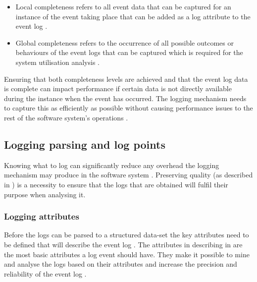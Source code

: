 \begin{itemize}
	\item Local completeness refers to all event data that can be captured for an instance of the event taking place that can be added as a log attribute to the event log \cite{Kherbouche2017, VanDerAalst2004}.
	\item Global completeness refers to the occurrence of all possible outcomes or behaviours of the event logs that can be captured which is required for the system utilisation analysis \cite{Kherbouche2017, VanDerAalst2004}.
\end{itemize}

Ensuring that both completeness levels are achieved and that the event log data is complete can impact performance if certain data is not directly available during the instance when the event has occurred. The logging mechanism needs to capture this as efficiently as possible without causing performance issues to the rest of the software system's operations \cite{Zhu2015, Zhu2019}. 

\subsection{Logging parsing and log points}\label{sec:ch1_loggignPoints}
Knowing what to log can significantly reduce any overhead the logging mechanism may produce in the software system \cite{Jia2018, Pecchia2015}. Preserving quality (as described in ) is a necessity to ensure that the logs that are obtained will fulfil their purpose when analysing it.

\subsubsection{Logging attributes}
Before the logs can be parsed to a structured data-set the key attributes need to be defined that will describe the event log \cite{Bekeneva2020}. The attributes in describing in  are the most basic attributes a log event should have. They make it possible to mine and analyse the logs based on their attributes and increase the precision and reliability of the event log \cite{Kherbouche2017}.

